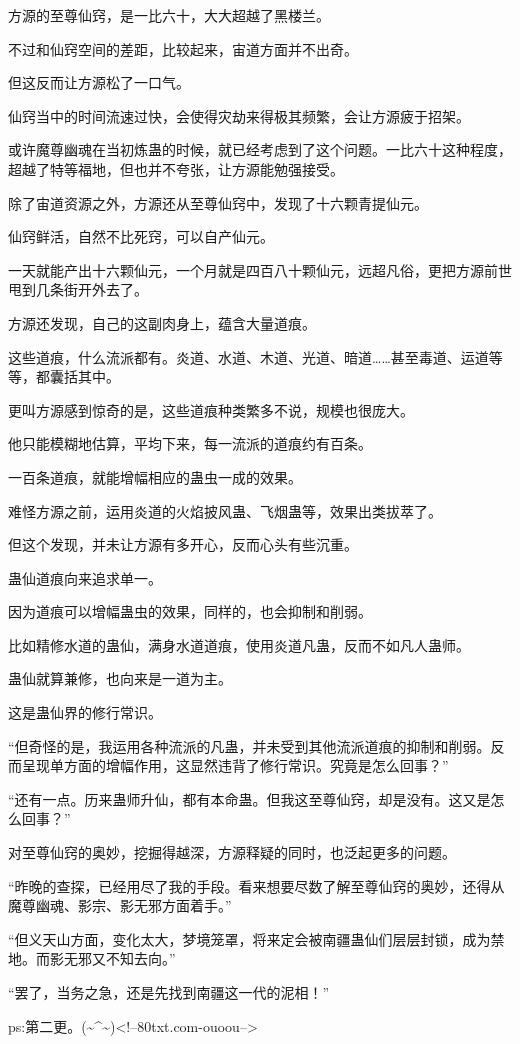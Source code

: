\begin{this_body}
方源的至尊仙窍，是一比六十，大大超越了黑楼兰。

不过和仙窍空间的差距，比较起来，宙道方面并不出奇。

但这反而让方源松了一口气。

仙窍当中的时间流速过快，会使得灾劫来得极其频繁，会让方源疲于招架。

或许魔尊幽魂在当初炼蛊的时候，就已经考虑到了这个问题。一比六十这种程度，超越了特等福地，但也并不夸张，让方源能勉强接受。

除了宙道资源之外，方源还从至尊仙窍中，发现了十六颗青提仙元。

仙窍鲜活，自然不比死窍，可以自产仙元。

一天就能产出十六颗仙元，一个月就是四百八十颗仙元，远超凡俗，更把方源前世甩到几条街开外去了。

方源还发现，自己的这副肉身上，蕴含大量道痕。

这些道痕，什么流派都有。炎道、水道、木道、光道、暗道……甚至毒道、运道等等，都囊括其中。

更叫方源感到惊奇的是，这些道痕种类繁多不说，规模也很庞大。

他只能模糊地估算，平均下来，每一流派的道痕约有百条。

一百条道痕，就能增幅相应的蛊虫一成的效果。

难怪方源之前，运用炎道的火焰披风蛊、飞烟蛊等，效果出类拔萃了。

但这个发现，并未让方源有多开心，反而心头有些沉重。

蛊仙道痕向来追求单一。

因为道痕可以增幅蛊虫的效果，同样的，也会抑制和削弱。

比如精修水道的蛊仙，满身水道道痕，使用炎道凡蛊，反而不如凡人蛊师。

蛊仙就算兼修，也向来是一道为主。

这是蛊仙界的修行常识。

“但奇怪的是，我运用各种流派的凡蛊，并未受到其他流派道痕的抑制和削弱。反而呈现单方面的增幅作用，这显然违背了修行常识。究竟是怎么回事？”

“还有一点。历来蛊师升仙，都有本命蛊。但我这至尊仙窍，却是没有。这又是怎么回事？”

对至尊仙窍的奥妙，挖掘得越深，方源释疑的同时，也泛起更多的问题。

“昨晚的查探，已经用尽了我的手段。看来想要尽数了解至尊仙窍的奥妙，还得从魔尊幽魂、影宗、影无邪方面着手。”

“但义天山方面，变化太大，梦境笼罩，将来定会被南疆蛊仙们层层封锁，成为禁地。而影无邪又不知去向。”

“罢了，当务之急，还是先找到南疆这一代的泥相！”

ps:第二更。(\~{}\^{}\~{})<!--80txt.com-ouoou-->

\end{this_body}

